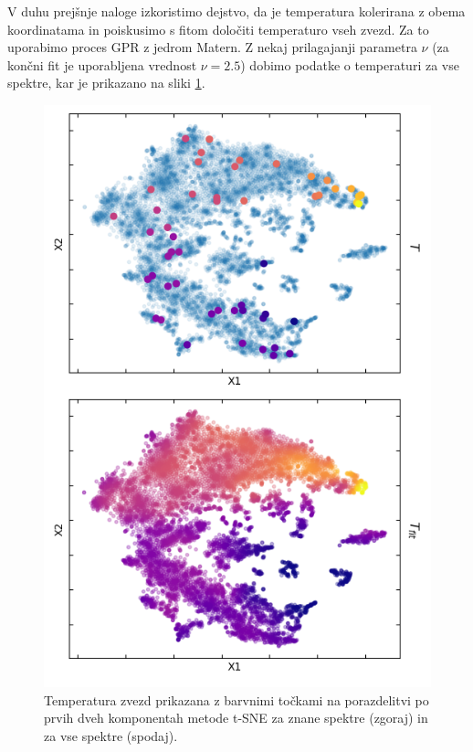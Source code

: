 \documentclass[11pt,a4paper]{article}
\begin{document}
V duhu prejšnje naloge izkoristimo dejstvo, da je temperatura kolerirana z obema koordinatama in poiskusimo s fitom določiti temperaturo vseh zvezd. Za to uporabimo proces GPR z jedrom Matern. Z nekaj prilagajanji parametra $\nu$ (za končni fit je uporabljena vrednost $\nu=2.5$) dobimo podatke o temperaturi za vse spektre, kar je prikazano na sliki \ref{10}.

\clearpage

\begin{figure}[h]
    \centering
    \hbox{\hspace{10em}\includegraphics[scale=0.7]{T_fit}}
    \caption{Temperatura zvezd prikazana z barvnimi točkami na porazdelitvi po prvih dveh komponentah metode t-SNE za znane spektre (zgoraj) in za vse spektre (spodaj).}
    \label{10}
\end{figure}
\end{document}

